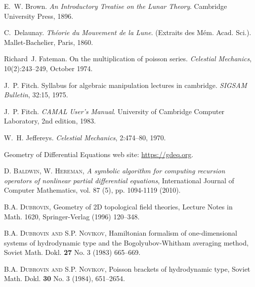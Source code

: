 \begin{thebibliography}{999}
E.~W. Brown.
\newblock \emph{An Introductory Treatise on the Lunar Theory}.
\newblock Cambridge University Press, 1896.

C.~Delaunay.
\newblock \emph{Th\'eorie du Mouvement de la Lune}.
\newblock (Extraits des M\'em. Acad. Sci.). Mallet-Bachelier, Paris, 1860.

Richard~J. Fateman.
\newblock On the multiplication of poisson series.
\newblock \emph{Celestial Mechanics}, 10(2):243--249, October 1974.

J.~P. Fitch.
\newblock Syllabus for algebraic manipulation lectures in cambridge.
\newblock \emph{SIGSAM Bulletin}, 32:15, 1975.

J.~P. Fitch.
\newblock \emph{{CAMAL} {User's} {Manual}}.
\newblock University of Cambridge Computer Laboratory, 2nd edition, 1983.

W.~H. Jeffereys.
\newblock \emph{Celestial Mechanics}, 2:474--80, 1970.


 Geometry of Differential Equations web site:
  \url{https://gdeq.org}.


 \textsc{D. Baldwin, W. Hereman}, \emph{A symbolic algorithm
    for computing recursion operators of nonlinear partial differential
    equations}, International Journal of Computer Mathematics, vol. 87 (5),
  pp. 1094-1119 (2010).

 \textsc{B.A. Dubrovin}, \newblock Geometry of 2D topological
field theories, Lecture Notes in Math. 1620, Springer-Verlag (1996) 120--348.

 \textsc{B.A. Dubrovin and S.P. Novikov}, \newblock Hamiltonian
  formalism of one-dimensional systems of hydrodynamic type and the
  Bogolyubov-Whitham averaging method, Soviet Math. Dokl. \textbf{27} No. 3
  (1983) 665--669.

 \textsc{B.A. Dubrovin and S.P. Novikov}, Poisson brackets of
  hydrodynamic type, Soviet Math. Dokl. \textbf{30} No. 3 (1984), 651--2654.


\end{thebibliography}
